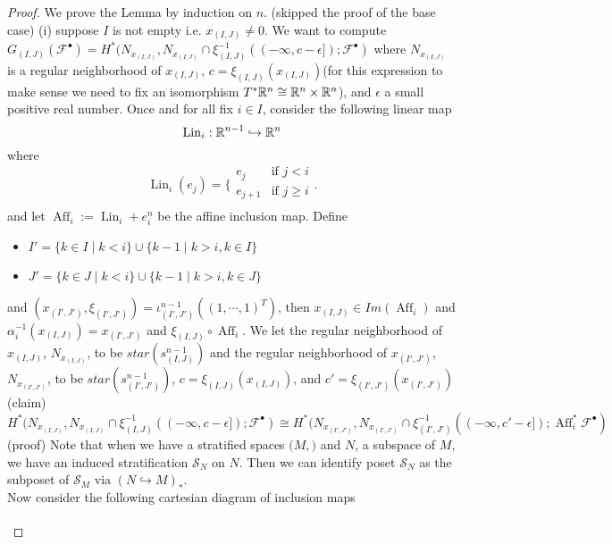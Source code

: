 \begin{proof}
We prove the Lemma by induction on $n$.
(skipped the proof of the base case)
(i) suppose $I$ is not empty i.e. $x_{(I,J)} \neq 0$. We want to compute $G_{(I,J)}(\mathscr{F}^\bullet) = H^*(N_{x_{(I,J)}}, N_{x_{(I,J)}} \cap \xi_{(I,J)}^{-1}((-\infty,c-\epsilon]); \mathscr{F}^\bullet)$ where $N_{x_{(I,J)}}$ is a regular neighborhood of $x_{(I,J)}$, $c = \xi_{(I,J)}(x_{(I,J)})$(for this expression to make sense we need to fix an isomorphism $T^*\mathbb{R}^n \cong \mathbb{R}^n \times \mathbb{R}^n$), and $\epsilon$ a small positive real number. Once and for all fix $i\in I$, consider the following linear map
\[
\operatorname{Lin}_i : \mathbb{R}^{n-1} \hookrightarrow \mathbb{R}^n
\]
where
\[\operatorname{Lin}_i(e_j)=\bigg\{
\begin{array}{ll}
    e_j & \text{if } j < i \\
	e_{j+1} & \text{if } j \geq i \\
\end{array}
\bigg.
\] 
and let $\operatorname{Aff}_i := \operatorname{Lin}_i + e^n_i$ be the affine inclusion map. Define 
\begin{itemize}
\item $I' = \{k\in I \mid k<i\} \cup \{k-1 \mid k>i, k\in I\}$
\item $J' = \{k\in J \mid k<i\} \cup \{k-1 \mid k>i, k\in J\}$
\end{itemize}
and $(x_{(I',J')}, \xi_{(I',J')}) = \iota^{n-1}_{(I',J')}((1,\cdots,1)^T)$, then $x_{(I,J)} \in Im(\operatorname{Aff}_i)$ and $\alpha_i^{-1}(x_{(I,J)})=x_{(I',J')} $ and $\xi_{(I,J)} \circ \operatorname{Aff}_i$. We let the regular neighborhood of $x_{(I,J)}$, $N_{x_{(I,J)}}$, to be $star(s^{n-1}_{(I,J)})$ and the regular neighborhood of $x_{(I',J')}$, $N_{x_{(I',J')}}$, to be $star(s^{n-1}_{(I',J')})$, $c = \xi_{(I,J)}(x_{(I,J)})$, and $c' = \xi_{(I',J')}(x_{(I',J')})$\\
(claim) $H^*(N_{x_{(I,J)}}, N_{x_{(I,J)}}\cap \xi_{(I,J)}^{-1}((-\infty, c-\epsilon]); \mathscr{F}^\bullet) \cong H^*(N_{x_{(I',J')}}, N_{x_{(I',J')}}\cap \xi_{(I',J')}^{-1}((-\infty, c'-\epsilon]); \operatorname{Aff}_i^*\mathscr{F}^\bullet)$\\
(proof) Note that when we have a stratified spaces $(M,\mathcal)$ and $N$, a subspace of $M$, we have an induced stratification $\mathcal{S}_N$ on $N$. Then we can identify poset $\mathcal{S}_N$ as the subposet of $\mathcal{S}_M$ via $(N\hookrightarrow M)_*$.\\
Now consider the following cartesian diagram of inclusion maps
\[
\begin{tikzcd}

\end{tikzcd}\]
\end{proof}
